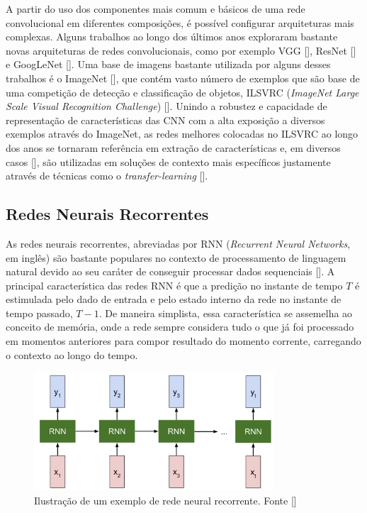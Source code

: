 A partir do uso dos componentes mais comum e básicos de uma rede convolucional em diferentes composições, é possível configurar arquiteturas mais complexas. Alguns trabalhos ao longo dos últimos anos exploraram bastante novas arquiteturas de redes convolucionais, como por exemplo VGG [], ResNet [] e GoogLeNet []. Uma base de imagens bastante utilizada por alguns desses trabalhos é o ImageNet [], que contém vasto número de exemplos que são base de uma competição de detecção e classificação de objetos, ILSVRC (\textit{ImageNet Large Scale Visual Recognition Challenge}) []. Unindo a robustez e capacidade de representação de características das CNN com a alta exposição a diversos exemplos através do ImageNet, as redes melhores colocadas no ILSVRC ao longo dos anos se tornaram referência em extração de características e, em diversos casos [], são utilizadas em soluções de contexto mais específicos justamente através de técnicas como o \textit{transfer-learning} [].


\subsection{Redes Neurais Recorrentes}
As redes neurais recorrentes, abreviadas por RNN (\textit{Recurrent Neural Networks}, em inglês) são bastante populares no contexto de processamento de linguagem natural devido ao seu caráter de conseguir processar dados sequenciais []. A principal característica das redes RNN é que a predição no instante de tempo $T$ é estimulada pelo dado de entrada e pelo estado interno da rede no instante de tempo passado, $T - 1$. De maneira simplista, essa característica se assemelha ao conceito de memória, onde a rede sempre considera tudo o que já foi processado em momentos anteriores para compor resultado do momento corrente, carregando o contexto ao longo do tempo.

\begin{figure}
    \centering
    \includegraphics[width=0.8\textwidth]{figs/theory-example-rnn.png}
    \caption{Ilustração de um exemplo de rede neural recorrente. Fonte []}
    \label{fig:theory-rnn-example}
\end{figure}

